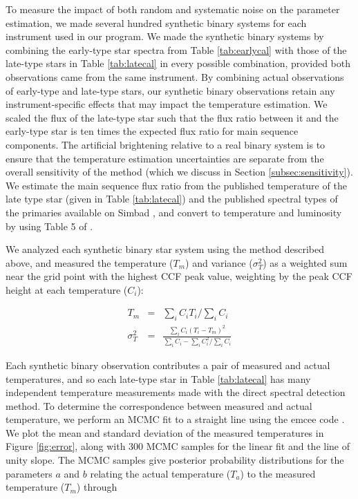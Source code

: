 \documentclass{emulateapj}
\begin{document}
To measure the impact of both random and systematic noise on the parameter estimation, we made several hundred synthetic binary systems for each instrument used in our program. We made the synthetic binary systems by combining the early-type star spectra from Table \ref{tab:earlycal} with those of the late-type stars in Table \ref{tab:latecal} in every possible combination, provided both observations came from the same instrument. By combining actual observations of early-type and late-type stars, our synthetic binary observations retain any instrument-specific effects that may impact the temperature estimation. We scaled the flux of the late-type star such that the flux ratio between it and the early-type star is ten times the expected flux ratio for main sequence components. The artificial brightening relative to a real binary system is to ensure that the temperature estimation uncertainties are separate from the overall sensitivity of the method (which we discuss in Section \ref{subsec:sensitivity}). We estimate the main sequence flux ratio from the published temperature of the late type star (given in Table \ref{tab:latecal}) and the published spectral types of the primaries available on Simbad \citep{Simbad}, and convert to temperature and luminosity by using Table 5 of \citet{Pecaut2013}.


We analyzed each synthetic binary star system using the method described above, and measured the temperature ($T_m$) and variance ($\sigma_T^2$) as a weighted sum near the grid point with the highest CCF peak value, weighting by the peak CCF height at each temperature ($C_i$):

\begin{eqnarray}
\label{eqn:tmeas} 
T_m &=& \sum_i C_i T_i / \sum_i C_i \\
\sigma_T^2 &=& \frac{\sum_i C_i (T_i - T_m)^2}{ \sum_i C_i - \sum_i C_i^2 / \sum_i C_i}
\end{eqnarray}

Each synthetic binary observation contributes a pair of measured and actual temperatures, and so each late-type star in Table \ref{tab:latecal} has many independent temperature measurements made with the direct spectral detection method. To determine the correspondence between measured and actual temperature, we perform an MCMC fit to a straight line using the emcee code \citep{emcee}. We plot the mean and standard deviation of the measured temperatures in Figure \ref{fig:error}, along with 300 MCMC samples for the linear fit and the line of unity slope. The MCMC samples give posterior probability distributions for the parameters $a$ and $b$ relating the actual temperature ($T_a$) to the measured temperature ($T_m$) through
\end{document}
